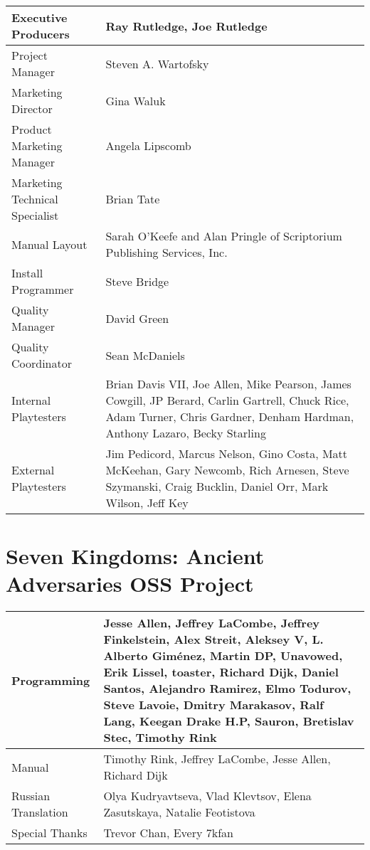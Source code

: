 \begin{tabular}{ | p{4cm} | p{9cm} |}
	\hline
	Executive Producers	& Ray Rutledge, Joe Rutledge \\ \hline
Project Manager	& Steven A. Wartofsky \\ \hline
Marketing Director	& Gina Waluk \\ \hline
Product Marketing Manager	& Angela Lipscomb \\ \hline
Marketing Technical Specialist	& Brian Tate \\ \hline
Manual Layout	& Sarah O’Keefe and Alan Pringle of Scriptorium Publishing Services, Inc. \\ \hline
Install Programmer	& Steve Bridge \\ \hline
Quality Manager	& David Green \\ \hline
Quality Coordinator	& Sean McDaniels \\ \hline
Internal Playtesters	& Brian Davis VII, Joe Allen, Mike Pearson, James Cowgill, JP Berard, Carlin Gartrell, Chuck Rice, Adam Turner, Chris Gardner, Denham Hardman, Anthony Lazaro, Becky Starling \\ \hline
External Playtesters	& Jim Pedicord, Marcus Nelson, Gino Costa, Matt McKeehan, Gary Newcomb, Rich Arnesen, Steve Szymanski, Craig Bucklin, Daniel Orr, Mark Wilson, Jeff Key \\ \hline
	\hline
\end{tabular}

\section{Seven Kingdoms: Ancient Adversaries OSS Project}

\begin{tabular}{ | p{4cm} | p{9cm} |}
	\hline
	Programming	& Jesse Allen, Jeffrey LaCombe, Jeffrey Finkelstein, Alex Streit, Aleksey V, L. Alberto Giménez, Martin DP, Unavowed, Erik Lissel, toaster, Richard Dijk, Daniel Santos, Alejandro Ramirez, Elmo Todurov, Steve Lavoie, Dmitry Marakasov, Ralf Lang, Keegan Drake H.P, Sauron, Bretislav Stec, Timothy Rink \\ \hline
Manual & Timothy Rink, Jeffrey LaCombe, Jesse Allen, Richard Dijk \\ \hline
Russian Translation	& Olya Kudryavtseva, Vlad Klevtsov, Elena Zasutskaya, Natalie Feotistova \\ \hline
Special Thanks	& Trevor Chan, Every 7kfan \\ \hline
	\hline
\end{tabular}